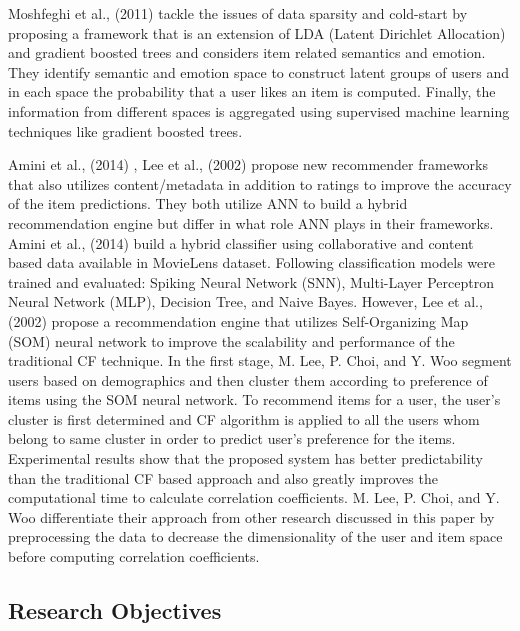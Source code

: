 \documentclass[12pt]{article}
\begin{document}
Moshfeghi et al., (2011) \cite{moshfeghi} tackle the issues of data sparsity and cold-start by proposing a framework that is an extension of LDA (Latent Dirichlet Allocation) and gradient boosted trees and considers item related semantics and emotion. They identify semantic and emotion space to construct latent groups of users and in each space the probability that a user likes an item is computed. Finally, the information from different spaces is aggregated using supervised machine learning techniques like gradient boosted trees. 

Amini et al., (2014) \cite{amini}, Lee et al., (2002) \cite{lee} propose new recommender frameworks that also utilizes content/metadata in addition to ratings to improve the accuracy of the item predictions. They both utilize ANN to build a hybrid recommendation engine but differ in what role ANN plays in their frameworks. Amini et al., (2014) \cite{amini} build a hybrid classifier using collaborative and content based data available in MovieLens dataset. Following classification models were trained and evaluated: Spiking Neural Network (SNN), Multi-Layer Perceptron Neural Network (MLP), Decision Tree, and Naive Bayes. However, Lee et al., (2002) \cite{lee} propose a recommendation engine that utilizes Self-Organizing Map (SOM) neural network to improve the scalability and performance of the traditional CF technique. In the first stage, M. Lee, P. Choi, and Y. Woo segment users based on demographics and then cluster them according to preference of items using the SOM neural network. To recommend items for a user, the user's cluster is first determined and CF algorithm is applied to all the users whom belong to same cluster in order to predict user's preference for the items. Experimental results show that the proposed system has better predictability than the traditional CF based approach and also greatly improves the computational time to calculate correlation coefficients. M. Lee, P. Choi, and Y. Woo differentiate their approach from other research discussed in this paper by preprocessing the data to decrease the dimensionality of the user and item space before computing correlation coefficients. 

\subsection{Research Objectives}
\end{document}
